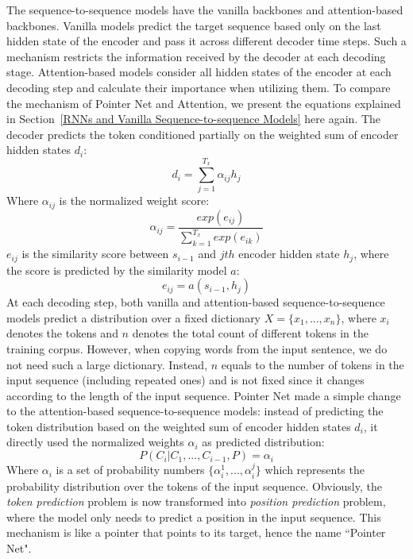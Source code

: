 The sequence-to-sequence models have the vanilla backbones and attention-based backbones. Vanilla models predict the target sequence based only on the last hidden state of the encoder and pass it across different decoder time steps. Such a mechanism restricts the information received by the decoder at each decoding stage. Attention-based models consider all hidden states of the encoder at each decoding step and calculate their importance when utilizing them. To compare the mechanism of Pointer Net and Attention, we present the equations explained in Section~\ref{RNNs and Vanilla Sequence-to-sequence Models} here again. The decoder predicts the token conditioned partially on the weighted sum of encoder hidden states $d_i$: 
\begin{equation}
d_i = \sum_{j=1}^{T_x}\alpha_{ij}h_j
\end{equation}
Where $\alpha_{ij}$ is the normalized weight score:
\begin{equation}
\alpha_{ij} = \frac{exp(e_{ij})}{\sum_{k=1}^{T_x}exp(e_{ik})}
\end{equation}
$e_{ij}$ is the similarity score between $s_{i-1}$ and $jth$ encoder hidden state $h_j$, where the score is predicted by the similarity model $a$: 
\begin{equation}
e_{ij} = a(s_{i-1}, h_j)
\end{equation}
At each decoding step, both vanilla and attention-based sequence-to-sequence models predict a distribution over a fixed dictionary $X = \{x_1, ..., x_n\}$, where $x_i$ denotes the tokens and $n$ denotes the total count of different tokens in the training corpus. However, when copying words from the input sentence, we do not need such a large dictionary. Instead, $n$ equals to the number of tokens in the input sequence (including repeated ones) and is not fixed since it changes according to the length of the input sequence. Pointer Net made a simple change to the attention-based sequence-to-sequence models: instead of predicting the token distribution based on the weighted sum of encoder hidden states $d_i$, it directly used the normalized weights $\alpha_i$ as predicted distribution: 
\begin{equation}
P(C_i|C_1, ..., C_{i-1}, P) = \alpha_i
\end{equation}
Where $\alpha_i$ is a set of probability numbers $\{\alpha_i^1, ..., \alpha_i^j\}$ which represents the probability distribution over the tokens of the input sequence. Obviously, the \textit{token prediction} problem is now transformed into \textit{position prediction} problem, where the model only needs to predict a position in the input sequence. This mechanism is like a pointer that points to its target, hence the name ``Pointer Net".

